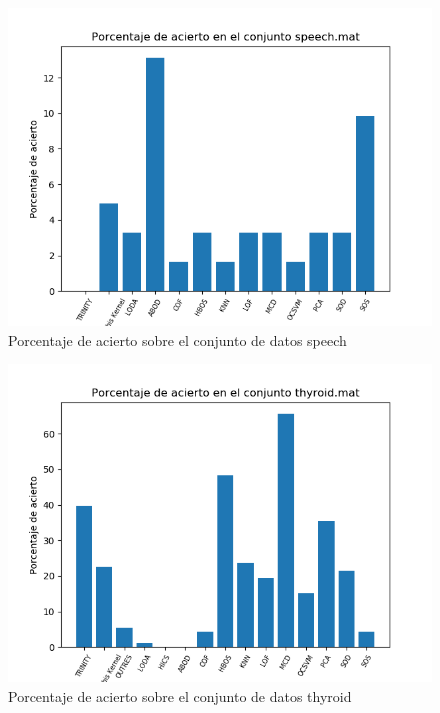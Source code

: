 \begin{figure}[H]
	\centering
	\label{speech_accuracy}
	\includegraphics[scale=0.7]{imagenes/imgs-exp1/accuracy/speech}
	\caption{Porcentaje de acierto sobre el conjunto de datos speech}
\end{figure}

\begin{figure}[H]
	\centering
	\label{thyroid_accuracy}
	\includegraphics[scale=0.7]{imagenes/imgs-exp1/accuracy/thyroid}
	\caption{Porcentaje de acierto sobre el conjunto de datos thyroid}
\end{figure}

